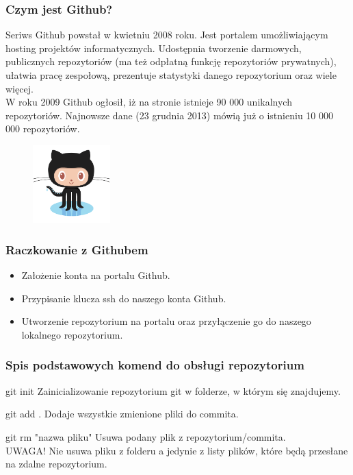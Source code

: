 \documentclass[9pt]{beamer}
\begin{document}
	\begin{frame}
		\frametitle{Czym jest Github?}
		Seriws Github powstał w kwietniu 2008 roku. Jest portalem umożliwiającym hosting projektów informatycznych. Udostępnia tworzenie darmowych, publicznych repozytoriów (ma też odpłatną funkcję repozytoriów prywatnych), ułatwia pracę zespołową, prezentuje statystyki danego repozytorium oraz wiele więcej.\\
		W roku 2009 Github ogłosił, iż na stronie istnieje 90 000 unikalnych repozytoriów. Najnowsze dane (23 grudnia 2013) mówią już o istnieniu 10 000 000 repozytoriów.
		
		
		
		
		\begin{figure}
			\centering
			\includegraphics[height=3cm]{Octocat.png}
		\end{figure}
		
		
		
	\end{frame}
	


	\begin{frame}
		\frametitle{Raczkowanie z Githubem}
		\begin{itemize}
			\item Założenie konta na portalu Github.
			\item Przypisanie klucza ssh do naszego konta Github.
			\item Utworzenie repozytorium na portalu oraz przyłączenie go do naszego lokalnego repozytorium.
		\end{itemize}
	\end{frame}


	\begin{frame}
		\frametitle{Spis podstawowych komend do obsługi repozytorium}
			\begin{block}{git init}
				Zainicializowanie repozytorium git w folderze, w którym się znajdujemy.
			\end{block}

			\begin{block}{git add .}
				Dodaje wszystkie zmienione pliki do commita.
			\end{block}
			
			\begin{block}{git rm "nazwa pliku"}
				Usuwa podany plik z repozytorium/commita. \\UWAGA! Nie usuwa pliku z folderu a jedynie z listy plików, które będą przesłane na zdalne repozytorium.
			\end{block}			


	\end{frame}
\end{document}

